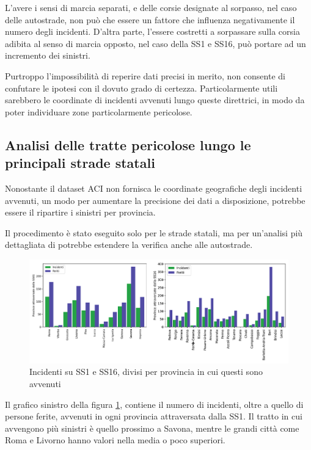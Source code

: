 \documentclass[a4paper,12pt]{report}
\begin{document}
L'avere i sensi di marcia separati, e delle corsie designate al sorpasso, nel caso 
delle autostrade, non può che essere un fattore che influenza negativamente 
il numero degli incidenti. 
D'altra parte, l'essere costretti a sorpassare sulla corsia adibita al senso di 
marcia opposto, nel caso della SS1 e SS16, può portare ad un incremento dei 
sinistri. 

Purtroppo l'impossibilità di reperire dati precisi in merito, 
non consente di confutare le ipotesi con il dovuto grado di certezza.
Particolarmente utili sarebbero le coordinate di incidenti avvenuti lungo queste direttrici, 
in modo da poter individuare zone particolarmente pericolose.

\subsection{Analisi delle tratte pericolose lungo le principali strade statali}

Nonostante il dataset ACI non fornisca le coordinate geografiche degli incidenti avvenuti, 
un modo per aumentare la precisione dei dati a disposizione, potrebbe essere il 
ripartire i sinistri per provincia. 

Il procedimento è stato eseguito solo per le strade statali, 
ma per un'analisi più dettagliata di potrebbe estendere la verifica anche alle autostrade.

\begin{figure}
    \includegraphics[width=\linewidth]{img_unite/tratti_ss1_ss16.png}
    \caption{Incidenti su SS1 e SS16, divisi per provincia in cui questi sono avvenuti}
    \label{fig:incidenti-strade-statali}
\end{figure}

Il grafico sinistro della figura \ref{fig:incidenti-strade-statali}, 
contiene il numero di incidenti, oltre a quello di persone ferite, 
avvenuti in ogni provincia attraversata dalla SS1. 
Il tratto in cui avvengono più sinistri è quello prossimo a Savona, 
mentre le grandi città come 
Roma e Livorno hanno valori nella media o poco superiori. 
\end{document}
